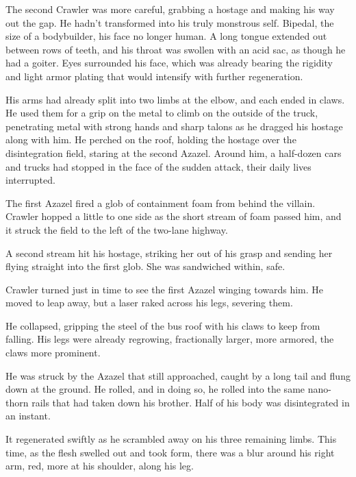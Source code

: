 The second Crawler was more careful, grabbing a hostage and making his way out the gap.  He hadn't transformed into his truly monstrous self.  Bipedal, the size of a bodybuilder, his face no longer human.  A long tongue extended out between rows of teeth, and his throat was swollen with an acid sac, as though he had a goiter.  Eyes surrounded his face, which was already bearing the rigidity and light armor plating that would intensify with further regeneration.



His arms had already split into two limbs at the elbow, and each ended in claws.  He used them for a grip on the metal to climb on the outside of the truck, penetrating metal with strong hands and sharp talons as he dragged his hostage along with him.  He perched on the roof, holding the hostage over the disintegration field, staring at the second Azazel.  Around him, a half-dozen cars and trucks had stopped in the face of the sudden attack, their daily lives interrupted.



The first Azazel fired a glob of containment foam from behind the villain.  Crawler hopped a little to one side as the short stream of foam passed him, and it struck the field to the left of the two-lane highway.



A second stream hit his hostage, striking her out of his grasp and sending her flying straight into the first glob.  She was sandwiched within, safe.



Crawler turned just in time to see the first Azazel winging towards him.  He moved to leap away, but a laser raked across his legs, severing them.



He collapsed, gripping the steel of the bus roof with his claws to keep from falling.  His legs were already regrowing, fractionally larger, more armored, the claws more prominent.



He was struck by the Azazel that still approached, caught by a long tail and flung down at the ground.  He rolled, and in doing so, he rolled into the same nano-thorn rails that had taken down his brother.  Half of his body was disintegrated in an instant.



It regenerated swiftly as he scrambled away on his three remaining  limbs.  This time, as the flesh swelled out and took form, there was a blur around his right arm, red, more at his shoulder, along his leg.



